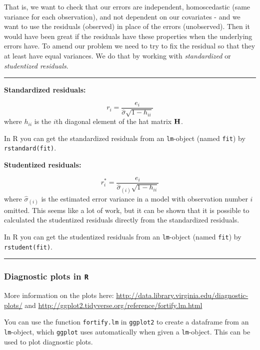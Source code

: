 \documentclass[]{article}
\begin{document}
That is, we want to check that our errors are independent, homoscedastic
(same variance for each observation), and not dependent on our
covariates - and we want to use the residuals (observed) in place of the
errors (unobserved). Then it would have been great if the residuals have
these properties when the underlying errors have. To amend our problem
we need to try to fix the residual so that they at least have equal
variances. We do that by working with \emph{standardized} or
\emph{studentized residuals}.

\begin{center}\rule{0.5\linewidth}{\linethickness}\end{center}

\textbf{Standardized residuals:}

\[r_i=\frac{e_i}{\hat{\sigma}\sqrt{1-h_{ii}}}\] where \(h_{ii}\) is the
\(i\)th diagonal element of the hat matrix \({\bf H}\).

In R you can get the standardized residuals from an \texttt{lm}-object
(named \texttt{fit}) by \texttt{rstandard(fit)}.

\textbf{Studentized residuals:}

\[r^*_i=\frac{e_i}{\hat{\sigma}_{(i)}\sqrt{1-h_{ii}}}\] where
\(\hat{\sigma}_{(i)}\) is the estimated error variance in a model with
observation number \(i\) omitted. This seems like a lot of work, but it
can be shown that it is possible to calculated the studentized residuals
directly from the standardized residuals.

In R you can get the studentized residuals from an \texttt{lm}-object
(named \texttt{fit}) by \texttt{rstudent(fit)}.

\begin{center}\rule{0.5\linewidth}{\linethickness}\end{center}

\hypertarget{diagnostic-plots-in-r}{%
\subsubsection{\texorpdfstring{Diagnostic plots in
\texttt{R}}{Diagnostic plots in R}}\label{diagnostic-plots-in-r}}

More information on the plots here:
\url{http://data.library.virginia.edu/diagnostic-plots/} and
\url{http://ggplot2.tidyverse.org/reference/fortify.lm.html}

You can use the function \texttt{fortify.lm} in \texttt{ggplot2} to
create a dataframe from an \texttt{lm}-object, which \texttt{ggplot}
uses automatically when given a \texttt{lm}-object. This can be used to
plot diagnostic plots.
\end{document}
